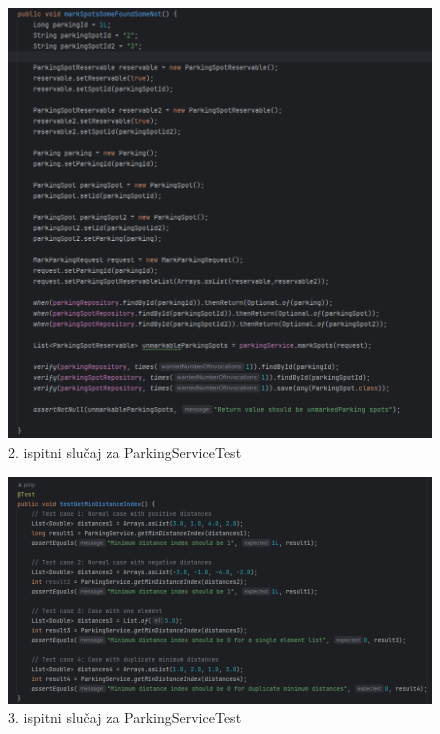 \begin{figure}[H]
	\includegraphics[width=\textwidth]{slike/markspotfound.png} %
	\centering
	\caption{2. ispitni slučaj za ParkingServiceTest}
	\label{fig:dijagramstanja}
\end{figure}

\begin{figure}[H]
	\includegraphics[width=\textwidth]{slike/testmindistance.png} %
	\centering
	\caption{3. ispitni slučaj za ParkingServiceTest}
	\label{fig:dijagramstanja}
\end{figure}

